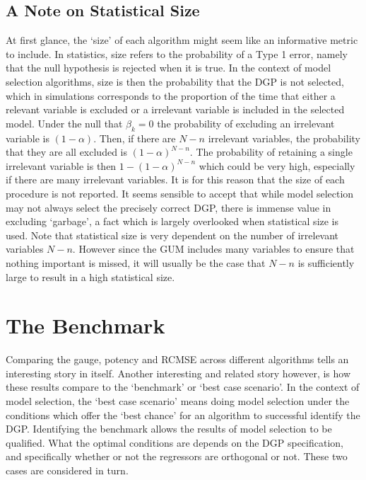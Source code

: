 \subsection{A Note on Statistical Size}

At first glance, the `size' of each algorithm might seem like an informative metric to include. In statistics, size refers to the probability of a Type 1 error, namely that the null hypothesis is rejected when it is true. In the context of model selection algorithms, size is then the probability that the DGP is not selected, which in simulations corresponds to the proportion of the time that either a relevant variable is excluded or a irrelevant variable is included in the selected model. Under the null that $\beta_{k} = 0$ the probability of excluding an irrelevant variable is $(1-\alpha)$. Then, if there are $N-n$ irrelevant variables, the probability that they are all excluded is $(1-\alpha)^{N-n}$. The probability of retaining a single irrelevant variable is then $ 1 - (1-\alpha)^{N-n}$ which could be very high, especially if there are many irrelevant variables. It is for this reason that the size of each procedure is not reported. It seems sensible to accept that while model selection may not always select the precisely correct DGP, there is immense value in excluding `garbage', a fact which is largely overlooked when statistical size is used. Note that statistical size is very dependent on the number of irrelevant variables $N-n$. However since the GUM includes many variables to ensure that nothing important is missed, it will usually be the case that $N-n$ is sufficiently large to result in a high statistical size.




\section{The Benchmark}

Comparing the gauge, potency and RCMSE across different algorithms tells an interesting story in itself. Another interesting and related story however, is how these results compare to the `benchmark' or `best case scenario'. In the context of model selection, the `best case scenario' means doing model selection under the conditions which offer the `best chance' for an algorithm to successful identify the DGP. Identifying the benchmark allows the results of model selection to be qualified. What the optimal conditions are depends on the DGP specification, and specifically whether or not the regressors are orthogonal or not. These two cases are considered in turn.

